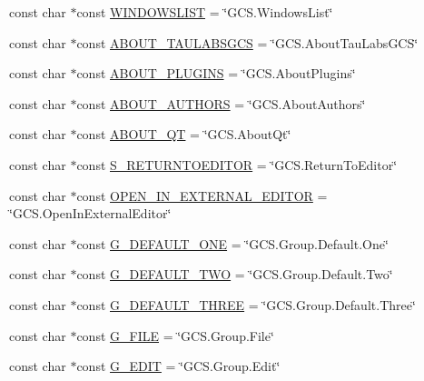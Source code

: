 \begin{DoxyCompactItemize}
\item 
const char $\ast$const \hyperlink{group___core_plugin_ga131a36808daf98493ba6caac1df75d3f}{W\-I\-N\-D\-O\-W\-S\-L\-I\-S\-T} = \char`\"{}G\-C\-S.\-Windows\-List\char`\"{}
\item 
const char $\ast$const \hyperlink{group___core_plugin_ga3e397585903bccc171404c5e9e28db57}{A\-B\-O\-U\-T\-\_\-\-T\-A\-U\-L\-A\-B\-S\-G\-C\-S} = \char`\"{}G\-C\-S.\-About\-Tau\-Labs\-G\-C\-S\char`\"{}
\item 
const char $\ast$const \hyperlink{group___core_plugin_ga095daad5ebb7bc7b081dcf9189effc4a}{A\-B\-O\-U\-T\-\_\-\-P\-L\-U\-G\-I\-N\-S} = \char`\"{}G\-C\-S.\-About\-Plugins\char`\"{}
\item 
const char $\ast$const \hyperlink{group___core_plugin_gae913d5d04138374d54ecfdabbc3d01ad}{A\-B\-O\-U\-T\-\_\-\-A\-U\-T\-H\-O\-R\-S} = \char`\"{}G\-C\-S.\-About\-Authors\char`\"{}
\item 
const char $\ast$const \hyperlink{group___core_plugin_gaa6fbd8445ba06f267495ee4f86525521}{A\-B\-O\-U\-T\-\_\-\-Q\-T} = \char`\"{}G\-C\-S.\-About\-Qt\char`\"{}
\item 
const char $\ast$const \hyperlink{group___core_plugin_gab51aa14ec9c9023785bafb4efa396553}{S\-\_\-\-R\-E\-T\-U\-R\-N\-T\-O\-E\-D\-I\-T\-O\-R} = \char`\"{}G\-C\-S.\-Return\-To\-Editor\char`\"{}
\item 
const char $\ast$const \hyperlink{group___core_plugin_gaf07120113ef10979e6ee49d688fb42ce}{O\-P\-E\-N\-\_\-\-I\-N\-\_\-\-E\-X\-T\-E\-R\-N\-A\-L\-\_\-\-E\-D\-I\-T\-O\-R} = \char`\"{}G\-C\-S.\-Open\-In\-External\-Editor\char`\"{}
\item 
const char $\ast$const \hyperlink{group___core_plugin_ga522e575966eb8fe2374da35aac3e7d69}{G\-\_\-\-D\-E\-F\-A\-U\-L\-T\-\_\-\-O\-N\-E} = \char`\"{}G\-C\-S.\-Group.\-Default.\-One\char`\"{}
\item 
const char $\ast$const \hyperlink{group___core_plugin_ga4f77e1e87898edaae0fa296fdab5806d}{G\-\_\-\-D\-E\-F\-A\-U\-L\-T\-\_\-\-T\-W\-O} = \char`\"{}G\-C\-S.\-Group.\-Default.\-Two\char`\"{}
\item 
const char $\ast$const \hyperlink{group___core_plugin_gaa9d110a5d72f47a9f4893a54bebdef9d}{G\-\_\-\-D\-E\-F\-A\-U\-L\-T\-\_\-\-T\-H\-R\-E\-E} = \char`\"{}G\-C\-S.\-Group.\-Default.\-Three\char`\"{}
\item 
const char $\ast$const \hyperlink{group___core_plugin_ga68db58071fb0d35ee9d75b0b2186511a}{G\-\_\-\-F\-I\-L\-E} = \char`\"{}G\-C\-S.\-Group.\-File\char`\"{}
\item 
const char $\ast$const \hyperlink{group___core_plugin_gabb38089b62cacebd11469129718e295f}{G\-\_\-\-E\-D\-I\-T} = \char`\"{}G\-C\-S.\-Group.\-Edit\char`\"{}

\end{DoxyCompactItemize}
